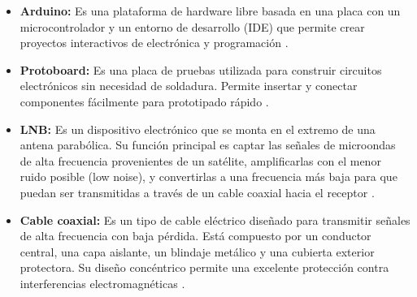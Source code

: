 \begin{itemize}
  \item \textbf{Arduino:} Es una plataforma de hardware libre basada en una placa
    con un microcontrolador y un entorno de desarrollo (IDE) que permite crear
    proyectos interactivos de electrónica y programación \cite{Arduino2025}.

  \item \textbf{Protoboard:} Es una placa de pruebas utilizada para construir
    circuitos electrónicos sin necesidad de soldadura.
    Permite insertar y conectar componentes fácilmente para prototipado rápido
    \cite{Horowitz1990}.

  \item \textbf{LNB:} Es un dispositivo electrónico que se monta en el extremo
    de una antena parabólica.
    Su función principal es captar las señales de microondas de alta frecuencia
    provenientes de un satélite, amplificarlas con el menor ruido posible
    (low noise), y convertirlas a una frecuencia más baja para que puedan ser
    transmitidas a través de un cable coaxial hacia el receptor \cite{ITU2025}.

  \item \textbf{Cable coaxial:} Es un tipo de cable eléctrico diseñado para
    transmitir señales de alta frecuencia con baja pérdida.
    Está compuesto por un conductor central, una capa aislante, un blindaje
    metálico y una cubierta exterior protectora.
    Su diseño concéntrico permite una excelente protección contra interferencias
    electromagnéticas \cite{Horowitz1990}.

\end{itemize}
